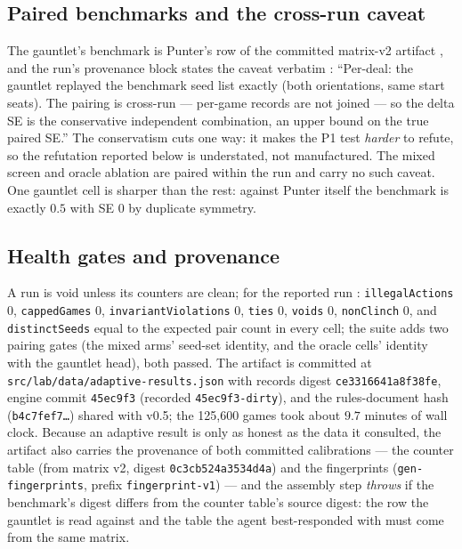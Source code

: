 \documentclass[11pt]{article}
\newcommand{\code}[1]{\texttt{#1}}
\begin{document}
\subsection{Paired benchmarks and the cross-run caveat}
\label{sec:pairing}

The gauntlet's benchmark is Punter's row of the committed matrix-v2 artifact
\cite{matrixv2}, and the run's provenance block states the caveat verbatim
\cite{artifact}: ``Per-deal: the gauntlet replayed the benchmark seed list exactly (both
orientations, same start seats). The pairing is cross-run --- per-game records are not
joined --- so the delta SE is the conservative independent combination, an upper bound on
the true paired SE.'' The conservatism cuts one way: it makes the P1 test \emph{harder}
to refute, so the refutation reported below is understated, not manufactured. The mixed
screen and oracle ablation are paired within the run and carry no such caveat. One
gauntlet cell is sharper than the rest: against Punter itself the benchmark is exactly
$0.5$ with SE $0$ by duplicate symmetry.

\subsection{Health gates and provenance}
\label{sec:provenance}

A run is void unless its counters are clean; for the reported run \cite{artifact}:
\code{illegalActions} 0, \code{cappedGames} 0, \code{invariantViolations} 0, \code{ties}
0, \code{voids} 0, \code{nonClinch} 0, and \code{distinctSeeds} equal to the expected pair
count in every cell; the suite adds two pairing gates (the mixed arms' seed-set identity,
and the oracle cells' identity with the gauntlet head), both passed. The artifact is
committed at \code{src/lab/data/adaptive-results.json} with records digest
\code{ce3316641a8f38fe}, engine commit \code{45ec9f3} (recorded \code{45ec9f3-dirty}), and
the rules-document hash (\code{b4c7fef7\ldots}) shared with v0.5; the 125{,}600 games took
about $9.7$ minutes of wall clock. Because an adaptive result is only as honest as the
data it consulted, the artifact also carries the provenance of both committed calibrations
--- the counter table (from matrix v2, digest \code{0c3cb524a3534d4a}) and the
fingerprints (\code{gen-fingerprints}, prefix \code{fingerprint-v1}) --- and the assembly
step \emph{throws} if the benchmark's digest differs from the counter table's source
digest: the row the gauntlet is read against and the table the agent best-responded with
must come from the same matrix.
\end{document}
